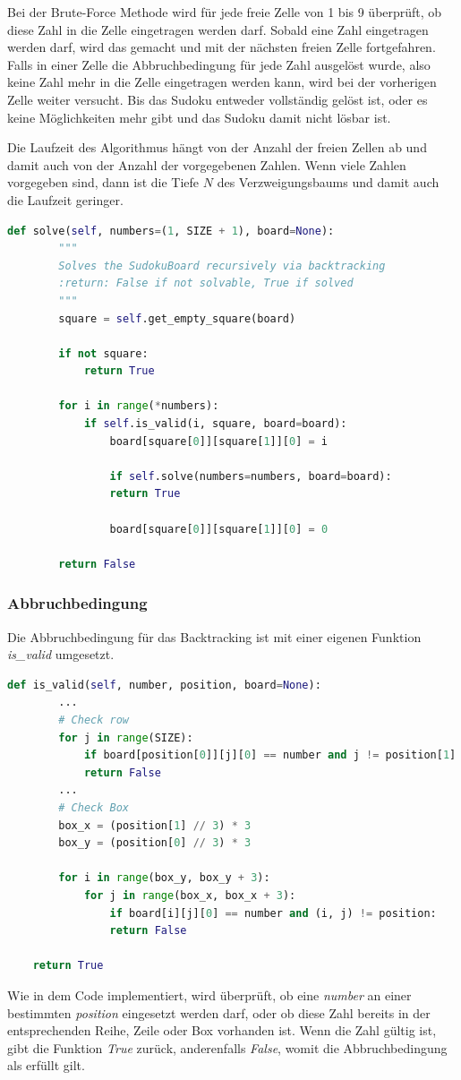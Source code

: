 Bei der Brute-Force Methode wird für jede freie Zelle von 1 bis 9 überprüft, ob diese Zahl in die Zelle eingetragen werden darf. Sobald eine Zahl eingetragen werden darf, wird das gemacht und mit der nächsten freien Zelle fortgefahren. Falls in einer Zelle die Abbruchbedingung für jede Zahl ausgelöst wurde, also keine Zahl mehr in die Zelle eingetragen werden kann, wird bei der vorherigen Zelle weiter versucht. Bis das Sudoku entweder vollständig gelöst ist, oder es keine Möglichkeiten mehr gibt und das Sudoku damit nicht lösbar ist.

Die Laufzeit des Algorithmus hängt von der Anzahl der freien Zellen ab und damit auch von der Anzahl der vorgegebenen Zahlen. Wenn viele Zahlen vorgegeben sind, dann ist die Tiefe $N$ des Verzweigungsbaums und damit auch die Laufzeit geringer. 



\begin{lstlisting}[language=Python, caption={Backtracking zum Lösen des Sudoku Rätsel}, label={lst:solve}]
	def solve(self, numbers=(1, SIZE + 1), board=None):
		"""
		Solves the SudokuBoard recursively via backtracking
		:return: False if not solvable, True if solved
		"""
		square = self.get_empty_square(board)
		
		if not square:
			return True
		
		for i in range(*numbers):
			if self.is_valid(i, square, board=board):
				board[square[0]][square[1]][0] = i
		
				if self.solve(numbers=numbers, board=board):
				return True
		
				board[square[0]][square[1]][0] = 0
		
		return False
\end{lstlisting}

\subsubsection{Abbruchbedingung}
Die Abbruchbedingung für das Backtracking ist mit einer eigenen Funktion \textit{is\_valid} umgesetzt.
\begin{lstlisting}[language=Python, caption={Abbruchbedingung Backtracking}, label={lst:valid}]
	def is_valid(self, number, position, board=None):
		...
		# Check row
		for j in range(SIZE):
			if board[position[0]][j][0] == number and j != position[1]:
			return False
		...
		# Check Box
		box_x = (position[1] // 3) * 3
		box_y = (position[0] // 3) * 3
		
		for i in range(box_y, box_y + 3):
			for j in range(box_x, box_x + 3):
				if board[i][j][0] == number and (i, j) != position:
				return False
		
	return True
\end{lstlisting}
Wie in dem Code implementiert, wird überprüft, ob eine \textit{number} an einer bestimmten \textit{position} eingesetzt werden darf, oder ob diese Zahl bereits in der entsprechenden Reihe, Zeile oder Box vorhanden ist. Wenn die Zahl gültig ist, gibt die Funktion \textit{True} zurück, anderenfalls \textit{False}, womit die Abbruchbedingung als erfüllt gilt. \cite{knott_2017} 

